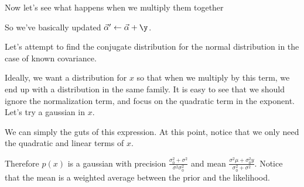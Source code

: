 \documentclass[12pt]{article}
\begin{document}
Now let's see what happens when we multiply them together


So we've basically updated $\vec \alpha' \leftarrow \vec \alpha+\y$.

Let's attempt to find the conjugate distribution for the normal distribution in the case of known covariance.


Ideally, we want a distribution for $x$ so that when we multiply by this term, we end up with a distribution in the same family. It is easy to see that we should ignore the normalization term, and focus on the quadratic term in the exponent. Let's try a gaussian in $x$.


We can simply the guts of this expression. At this point, notice that we only need the quadratic and linear terms of $x$. 


Therefore $p(x)$ is a gaussian with precision $\frac{\sigma_0^2 + \sigma^2}{\sigma^2 \sigma_0^2}$ and mean $\frac{\sigma^2 \mu + \sigma_0^2 y}{\sigma_0^2 + \sigma^2}$. Notice that the mean is a weighted average between the prior and the likelihood.
\end{document}
